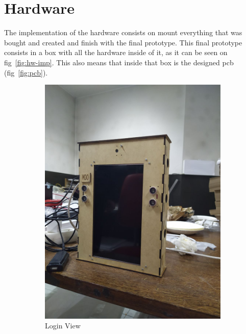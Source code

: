 \section{Hardware}
\label{sec:hw-imp}

The implementation of the hardware consists on mount everything that was bought and created and finish with the final prototype.
This final prototype consists in a box with all the hardware inside of it, as it can be seen on fig~\ref{fig:hw-imp}.
This also means that inside that box is the designed \gls{pcb} (fig~\ref{fig:pcb}).
\begin{figure}
\centering
  \begin{subfigure}{.4\textwidth}
  \includegraphics[width=\textwidth]{img/hw-all.jpg}%
  \caption{Login View}%
  \label{fig:hw-all}
\end{subfigure}
%
  \begin{subfigure}{.4\textwidth}

\end{subfigure}
\end{figure}
